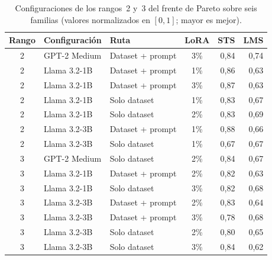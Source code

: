 \documentclass[12pt,a4paper]{report}
\begin{document}
\begin{table}[H]
\centering\footnotesize
\setlength{\tabcolsep}{4pt}
\caption{Configuraciones de los rangos~2 y~3 del frente de Pareto sobre seis familias (valores normalizados en $[0,1]$; mayor es mejor).}
\label{tab:ex_ranking_frentes}
\begin{tabularx}{\linewidth}{@{} c L Y c r r @{}}
\toprule
\textbf{Rango} & \textbf{Configuración} & \textbf{Ruta} & \textbf{LoRA} & \textbf{STS} & \textbf{LMS} \\
\midrule
2 & GPT-2 Medium & Dataset + prompt & 3\% & 0{,}84 & 0{,}74 \\
2 & Llama 3.2-1B & Dataset + prompt & 1\% & 0{,}86 & 0{,}63 \\
2 & Llama 3.2-1B & Dataset + prompt & 3\% & 0{,}87 & 0{,}63 \\
2 & Llama 3.2-1B & Solo dataset & 1\% & 0{,}83 & 0{,}67 \\
2 & Llama 3.2-1B & Solo dataset & 2\% & 0{,}83 & 0{,}69 \\
2 & Llama 3.2-3B & Dataset + prompt & 1\% & 0{,}88 & 0{,}66 \\
2 & Llama 3.2-3B & Solo dataset & 1\% & 0{,}67 & 0{,}67 \\
3 & GPT-2 Medium & Solo dataset & 2\% & 0{,}84 & 0{,}67 \\
3 & Llama 3.2-1B & Dataset + prompt & 2\% & 0{,}82 & 0{,}63 \\
3 & Llama 3.2-1B & Solo dataset & 3\% & 0{,}82 & 0{,}68 \\
3 & Llama 3.2-3B & Dataset + prompt & 2\% & 0{,}83 & 0{,}64 \\
3 & Llama 3.2-3B & Dataset + prompt & 3\% & 0{,}78 & 0{,}68 \\
3 & Llama 3.2-3B & Solo dataset & 2\% & 0{,}80 & 0{,}65 \\
3 & Llama 3.2-3B & Solo dataset & 3\% & 0{,}84 & 0{,}62 \\
\bottomrule
\end{tabularx}
\end{table}
\end{document}
